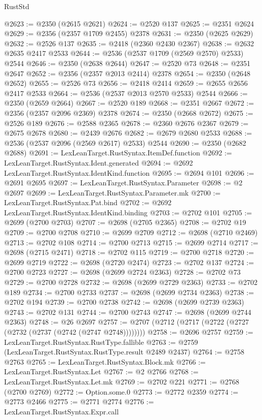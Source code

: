 \begin{lexlean}{RustStd}
\begin{coremodule}
@2623 := @2350 (@2615 @2621)
@2624 := @2520 @137
@2625 := @2351 @2624
@2629 := @2356 (@2357 @1709 @2455) @2378
@2631 := @2350 (@2625 @2629)
@2632 := @2526 @137
@2635 := @2418 (@2360 @2430 @2367)
@2638 := @2632 @2635 @2417 @2533
@2644 := @2536 (@2537 @1709 (@2569 @2570) @2533) @2544
@2646 := @2350 (@2638 @2644)
@2647 := @2520 @73
@2648 := @2351 @2647
@2652 := @2356 (@2357 @2013 @2414) @2378
@2654 := @2350 (@2648 @2652)
@2655 := @2526 @73
@2656 := @2418 @2414
@2659 := @2655 @2656 @2417 @2533
@2664 := @2536 (@2537 @2013 @2570 @2533) @2544
@2666 := @2350 (@2659 @2664)
@2667 := @2520 @189
@2668 := @2351 @2667
@2672 := @2356 (@2357 @2096 @2369) @2378
@2674 := @2350 (@2668 @2672)
@2675 := @2526 @189
@2676 := @2588 @2365
@2678 := @2360 @2676 @2367
@2679 := @2675 @2678
@2680 := @2439 @2676
@2682 := @2679 @2680 @2533
@2688 := @2536 (@2537 @2096 (@2569 @2617) @2533) @2544
@2690 := @2350 (@2682 @2688)
@2691 := LexLeanTarget.RustSyntax.ItemDef.function
@2692 := LexLeanTarget.RustSyntax.Ident.generated
@2694 := @2692 LexLeanTarget.RustSyntax.IdentKind.function
@2695 := @2694 @101
@2696 := @2691 @2695
@2697 := LexLeanTarget.RustSyntax.Parameter
@2698 := @2 @2697
@2699 := LexLeanTarget.RustSyntax.Parameter.mk
@2700 := LexLeanTarget.RustSyntax.Pat.bind
@2702 := @2692 LexLeanTarget.RustSyntax.IdentKind.binding
@2703 := @2702 @101
@2705 := @2699 (@2700 @2703)
@2707 := @2698 (@2705 @2365)
@2708 := @2702 @19
@2709 := @2700 @2708
@2710 := @2699 @2709
@2712 := @2698 (@2710 @2469)
@2713 := @2702 @108
@2714 := @2700 @2713
@2715 := @2699 @2714
@2717 := @2698 (@2715 @2471)
@2718 := @2702 @115
@2719 := @2700 @2718
@2720 := @2699 @2719
@2722 := @2698 (@2720 @2474)
@2723 := @2702 @137
@2724 := @2700 @2723
@2727 := @2698 (@2699 @2724 @2363)
@2728 := @2702 @73
@2729 := @2700 @2728
@2732 := @2698 (@2699 @2729 @2363)
@2733 := @2702 @189
@2734 := @2700 @2733
@2737 := @2698 (@2699 @2734 @2363)
@2738 := @2702 @194
@2739 := @2700 @2738
@2742 := @2698 (@2699 @2739 @2363)
@2743 := @2702 @131
@2744 := @2700 @2743
@2747 := @2698 (@2699 @2744 @2363)
@2748 := @26 @2697
@2757 := @2707 (@2712 (@2717 (@2722 (@2727 (@2732 (@2737 (@2742 (@2747 @2748))))))))
@2758 := @2696 @2757
@2759 := LexLeanTarget.RustSyntax.RustType.fallible
@2763 := @2759 (LexLeanTarget.RustSyntax.RustType.result @2489 @2437)
@2764 := @2758 @2763
@2765 := LexLeanTarget.RustSyntax.Block.mk
@2766 := LexLeanTarget.RustSyntax.Let
@2767 := @2 @2766
@2768 := LexLeanTarget.RustSyntax.Let.mk
@2769 := @2702 @221
@2771 := @2768 (@2700 @2769)
@2772 := Option.some.{0}
@2773 := @2772 @2359
@2774 := @2773 @2466
@2775 := @2771 @2774
@2776 := LexLeanTarget.RustSyntax.Expr.call

\end{coremodule}
\end{lexlean}
